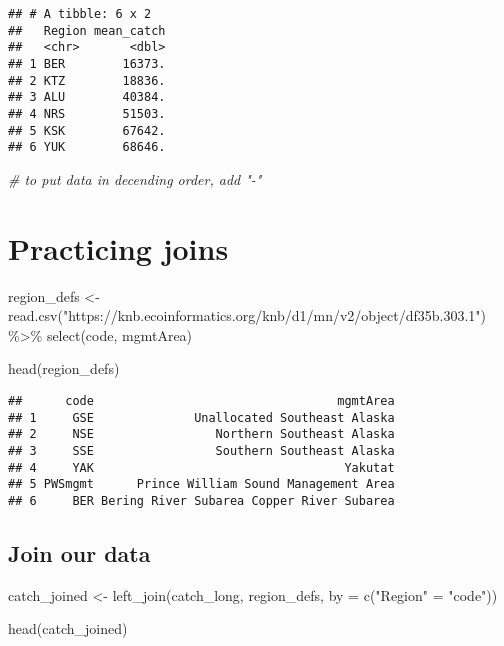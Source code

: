 \documentclass[
]{article}
\newenvironment{Shaded}{\begin{snugshade}}{\end{snugshade}}
\newcommand{\AttributeTok}[1]{\textcolor[rgb]{0.77,0.63,0.00}{#1}}
\newcommand{\CommentTok}[1]{\textcolor[rgb]{0.56,0.35,0.01}{\textit{#1}}}
\newcommand{\FunctionTok}[1]{\textcolor[rgb]{0.00,0.00,0.00}{#1}}
\newcommand{\NormalTok}[1]{#1}
\newcommand{\OtherTok}[1]{\textcolor[rgb]{0.56,0.35,0.01}{#1}}
\newcommand{\SpecialCharTok}[1]{\textcolor[rgb]{0.00,0.00,0.00}{#1}}
\newcommand{\StringTok}[1]{\textcolor[rgb]{0.31,0.60,0.02}{#1}}
\begin{document}
\begin{verbatim}
## # A tibble: 6 x 2
##   Region mean_catch
##   <chr>       <dbl>
## 1 BER        16373.
## 2 KTZ        18836.
## 3 ALU        40384.
## 4 NRS        51503.
## 5 KSK        67642.
## 6 YUK        68646.
\end{verbatim}

\begin{Shaded}
\begin{Highlighting}[]
\CommentTok{\# to put data in decending order, add "{-}"}
\end{Highlighting}
\end{Shaded}

\hypertarget{practicing-joins}{%
\section{Practicing joins}\label{practicing-joins}}

\begin{Shaded}
\begin{Highlighting}[]
\NormalTok{region\_defs }\OtherTok{\textless{}{-}} \FunctionTok{read.csv}\NormalTok{(}\StringTok{"https://knb.ecoinformatics.org/knb/d1/mn/v2/object/df35b.303.1"}\NormalTok{) }\SpecialCharTok{\%\textgreater{}\%} 
    \FunctionTok{select}\NormalTok{(code, mgmtArea)}

\FunctionTok{head}\NormalTok{(region\_defs)}
\end{Highlighting}
\end{Shaded}

\begin{verbatim}
##      code                                  mgmtArea
## 1     GSE              Unallocated Southeast Alaska
## 2     NSE                 Northern Southeast Alaska
## 3     SSE                 Southern Southeast Alaska
## 4     YAK                                   Yakutat
## 5 PWSmgmt      Prince William Sound Management Area
## 6     BER Bering River Subarea Copper River Subarea
\end{verbatim}

\hypertarget{join-our-data}{%
\subsection{Join our data}\label{join-our-data}}

\begin{Shaded}
\begin{Highlighting}[]
\NormalTok{catch\_joined }\OtherTok{\textless{}{-}} \FunctionTok{left\_join}\NormalTok{(catch\_long, region\_defs, }\AttributeTok{by =} \FunctionTok{c}\NormalTok{(}\StringTok{"Region"} \OtherTok{=} \StringTok{"code"}\NormalTok{))}

\FunctionTok{head}\NormalTok{(catch\_joined)}
\end{Highlighting}
\end{Shaded}
\end{document}
